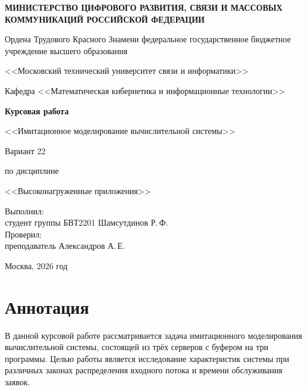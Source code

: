 \documentclass[14pt,a4paper]{extarticle}
\begin{document}
\begin{titlepage}
\begin{center}
\textbf{МИНИСТЕРСТВО ЦИФРОВОГО РАЗВИТИЯ, СВЯЗИ И МАССОВЫХ КОММУНИКАЦИЙ РОССИЙСКОЙ ФЕДЕРАЦИИ}

\vspace{0.3cm}
Ордена Трудового Красного Знамени федеральное государственное бюджетное учреждение высшего образования

<<Московский технический университет связи и информатики>>

\vspace{0.5cm}
Кафедра <<Математическая кибернетика и информационные технологии>>

\vspace{2cm}
{\Large \textbf{Курсовая работа}}

\vspace{0.3cm}
{\large <<Имитационное моделирование вычислительной системы>>}

\vspace{0.3cm}
{\large Вариант 22}

\vspace{0.3cm}
по дисциплине

<<Высоконагруженные приложения>>

\vspace{2cm}
\begin{flushright}
Выполнил:\\
студент группы БВТ2201 Шамсутдинов Р.\,Ф.\\[0.3cm]
Проверил:\\
преподаватель Александров А.\,Е.
\end{flushright}

\vfill
Москва, 2026 год
\end{center}
\end{titlepage}

\newpage
\section*{Аннотация}

В данной курсовой работе рассматривается задача имитационного моделирования
вычислительной системы, состоящей из трёх серверов с буфером на три программы.
Целью работы является исследование характеристик системы при различных законах
распределения входного потока и времени обслуживания заявок.
\end{document}
